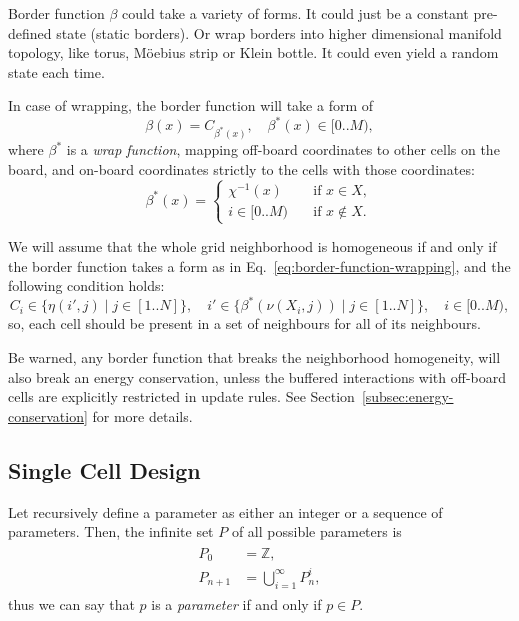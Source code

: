 \documentclass[a4paper,12pt,tikz,UTF8]{article}
\begin{document}
    Border function $\beta$ could take a variety of forms. It could just be a constant pre-defined state (static borders). Or wrap borders into higher dimensional manifold topology, like torus, M{\"o}ebius strip or Klein bottle. It could even yield a random state each time.

    In case of wrapping, the border function will take a form of
    \begin{equation}
      \label{eq:border-function-wrapping}
      \beta(x) = C_{\beta^*(x)}, \quad \beta^*(x) \in {[0 .. M)},
    \end{equation}
    where $\beta^*$ is a \textit{wrap function}, mapping off-board coordinates to other cells on the board, and on-board coordinates strictly to the cells with those coordinates:
    \begin{equation}
      \beta^*(x) = 
      \begin{cases}
        \chi^{-1}(x) & \quad \text{if } x \in X,\\
        i \in {[0 .. M)} & \quad \text{if } x \notin X.
      \end{cases}
    \end{equation}

    We will assume that the whole grid neighborhood is homogeneous if and only if the border function takes a form as in Eq.~\ref{eq:border-function-wrapping}, and the following condition holds:
    \begin{equation}
      \label{eq:neighborhood-homogeneity}
      C_i \in \{ \eta(i', j) \mid j \in {[1 .. N]} \}, \quad i' \in \{ \beta^*(\nu(X_i, j)) \mid j \in {[1 .. N]} \}, \quad i \in {[0 .. M)},
    \end{equation}
    so, each cell should be present in a set of neighbours for all of its neighbours.

    Be warned, any border function that breaks the neighborhood homogeneity, will also break an energy conservation, unless the buffered interactions with off-board cells are explicitly restricted in update rules. See Section~\ref{subsec:energy-conservation} for more details.

  \subsection{Single Cell Design}

    Let recursively define a parameter as either an integer or a sequence of parameters. Then, the infinite set $P$ of all possible parameters is
    \begin{align}
      \begin{split}
        P_0 &= \mathbb{Z},\\
        P_{n + 1} &= \bigcup_{i=1}^\infty{P_n^i,}
      \end{split}
    \end{align}
    thus we can say that $p$ is a \textit{parameter} if and only if $p \in P$.
\end{document}
